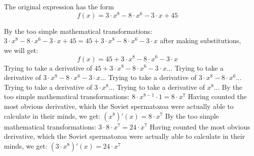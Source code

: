 \documentclass[a4paper, 12pt]{article}
\begin{document}
                          
The original expression has the form \[f(x) = {{{{{3} \cdot {{x} ^ {8}}} - {{8} \cdot {{x} ^ {6}}}} - {{3} \cdot {x}}} + {45}} \]

By the too simple mathematical transformations:
 ${{{{{3} \cdot {{x} ^ {8}}} - {{8} \cdot {{x} ^ {6}}}} - {{3} \cdot {x}}} + {45}} = {{45} + {{{{3} \cdot {{x} ^ {8}}} - {{8} \cdot {{x} ^ {6}}}} - {{3} \cdot {x}}}}$ 
 \newline
 \newline 
after making substitutions, we will get: \newline
 \[f(x) = {{45} + {{{{3} \cdot {{x} ^ {8}}} - {{8} \cdot {{x} ^ {6}}}} - {{3} \cdot {x}}}}\]\newline
\newline
Trying to take a derivative of ${{45} + {{{{3} \cdot {{x} ^ {8}}} - {{8} \cdot {{x} ^ {6}}}} - {{3} \cdot {x}}}}$...\newline
\newline
Trying to take a derivative of ${{{{3} \cdot {{x} ^ {8}}} - {{8} \cdot {{x} ^ {6}}}} - {{3} \cdot {x}}}$...\newline
\newline
Trying to take a derivative of ${{{3} \cdot {{x} ^ {8}}} - {{8} \cdot {{x} ^ {6}}}}$...\newline
\newline
Trying to take a derivative of ${{3} \cdot {{x} ^ {8}}}$...\newline
\newline
Trying to take a derivative of ${{x} ^ {8}}$...\newline
\newline
By the too simple mathematical transformations:
 ${{{8} \cdot {{x} ^ {{8} - {1}}}} \cdot {1}} = {{8} \cdot {{x} ^ {7}}}$ 
 \newline
 \newline 
Having counted the most obvious derivative, which the Soviet spermatozoa were actually able to calculate in their minds, we get:
$({{x} ^ {8}})'(x) = {{8} \cdot {{x} ^ {7}}}$\newline
\newline
By the too simple mathematical transformations:
 ${{3} \cdot {{8} \cdot {{x} ^ {7}}}} = {{24} \cdot {{x} ^ {7}}}$ 
 \newline
 \newline 
Having counted the most obvious derivative, which the Soviet spermatozoa were actually able to calculate in their minds, we get:
$({{3} \cdot {{x} ^ {8}}})'(x) = {{24} \cdot {{x} ^ {7}}}$\newline
\end{document}
